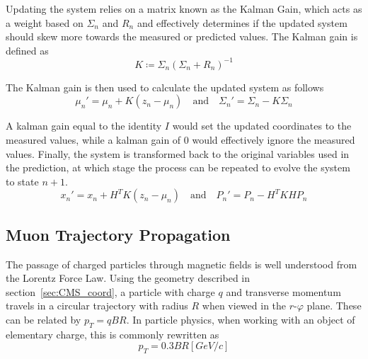 Updating the system relies on a matrix known as the Kalman Gain, which acts as a weight based on $\Sigma_n$ and $R_n$ and effectively determines if the updated system should skew more towards the measured or predicted values. The Kalman gain is defined as
\begin{equation}
	\label{eq:gain}
	K\coloneqq \Sigma_n\left(\Sigma_n+R_n\right)^{-1}
\end{equation}

The Kalman gain is then used to calculate the updated system as follows
\begin{equation}
	\label{eq:update1}
	\mu_n'=\mu_n+K\left(z_n-\mu_n\right) \quad \textrm{and} \quad \Sigma_n'=\Sigma_n-K\Sigma_n
\end{equation}

A kalman gain equal to the identity $I$ would set the updated coordinates to the measured values, while a kalman gain of $0$ would effectively ignore the measured values. Finally, the system is transformed back to the original variables used in the prediction, at which stage the process can be repeated to evolve the system to state $n+1$.
\begin{equation}
	x_n'=x_n+H^TK(z_n-\mu_n) \quad \mathrm{and} \quad P_n'= P_n-H^TKHP_n
\end{equation}

\subsection{Muon Trajectory Propagation} \label{sec:muons_prop}
The passage of charged particles through magnetic fields is well understood from the Lorentz Force Law. Using the geometry described in section~\ref{sec:CMS_coord}, a particle with charge $q$ and transverse momentum travels in a circular trajectory with radius $R$ when viewed in the $r$-$\varphi$ plane. These can be related by $p_{T} = qBR$. In particle physics, when working with an object of elementary charge, this is commonly rewritten as
\begin{equation}
	\label{eq:pt03br}
	p_{T} = 0.3BR\unit{[GeV/c]}
\end{equation} 

